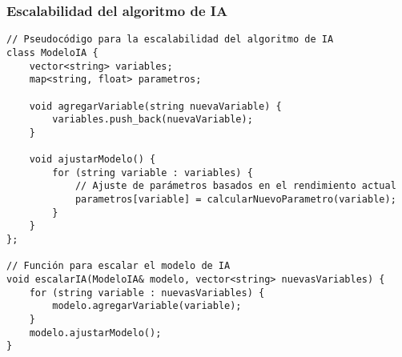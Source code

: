 \subsubsection{Escalabilidad del algoritmo de IA}

\begin{verbatim}
// Pseudocódigo para la escalabilidad del algoritmo de IA
class ModeloIA {
    vector<string> variables;
    map<string, float> parametros;

    void agregarVariable(string nuevaVariable) {
        variables.push_back(nuevaVariable);
    }

    void ajustarModelo() {
        for (string variable : variables) {
            // Ajuste de parámetros basados en el rendimiento actual
            parametros[variable] = calcularNuevoParametro(variable);
        }
    }
};

// Función para escalar el modelo de IA
void escalarIA(ModeloIA& modelo, vector<string> nuevasVariables) {
    for (string variable : nuevasVariables) {
        modelo.agregarVariable(variable);
    }
    modelo.ajustarModelo();
}
\end{verbatim}

